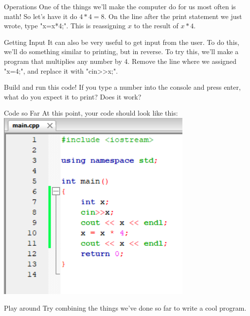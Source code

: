 \documentclass{beamer}
\begin{document}
\begin{frame}{Operations}
    One of the things we'll make the computer do for us most often is math! So let's have it do $4*4=8$. On the line after the print statement we just wrote, type "x=x*4;". This is \alert{reassigning} $x$ to the result of $x*4$. 
    
    
\end{frame}

\begin{frame}{Getting Input}
    It can also be very useful to get input from the user. To do this, we'll do something similar to printing, but in reverse. To try this, we'll make a program that multiplies any number by 4. Remove the line where we assigned "x=4;", and replace it with "cin>>x;".
    
    Build and run this code! If you type a number into the console and press enter, what do you expect it to print? Does it work?
\end{frame}

\begin{frame}{Code so Far}
    At this point, your code should look like this:
    \includegraphics[scale=1]{cpp3.png}
\end{frame}

\begin{frame}{Play around}
    Try combining the things we've done so far to write a cool program.
\end{frame}
\end{document}

